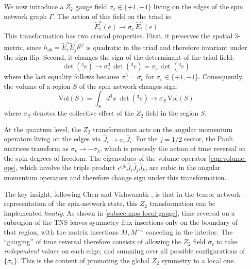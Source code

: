 \documentclass[preprint]{SciPost}
\theoremstyle{plain} %
\begin{document}
We now introduce a $ Z_2 $ gauge field $ \sigma_e \in \{+1, -1\} $ living on the edges of the spin network graph $ \Gamma $. The action of this field on the triad is:
\begin{equation}\label{eqn:z2-triad-action}
	\tilde E^a_i(e) \rightarrow \sigma_e \, \tilde E^a_i(e)
\end{equation}
This transformation has two crucial properties. First, it preserves the spatial 3-metric, since $ h_{ab} = \tilde E^a_i \tilde E^b_j \delta^{ij} $ is quadratic in the triad and therefore invariant under the sign flip. Second, it changes the sign of the determinant of the triad field:
\begin{equation}\label{eqn:z2-det-flip}
	\det({}^3 e) \rightarrow \sigma_e^3 \, \det({}^3 e) = \sigma_e \, \det({}^3 e)
\end{equation}
where the last equality follows because $ \sigma_e^3 = \sigma_e $ for $ \sigma_e \in \{+1, -1\} $. Consequently, the volume of a region $ S $ of the spin network changes sign:
\begin{equation}\label{eqn:z2-volume-flip}
	\text{Vol}(S) = \int_S d^3 x \, \det({}^3 e) \rightarrow \sigma_S \, \text{Vol}(S)
\end{equation}
where $ \sigma_S $ denotes the collective effect of the $ Z_2 $ field in the region $ S $.

At the quantum level, the $ Z_2 $ transformation acts on the angular momentum operators living on the edges via $ \hat J_i \rightarrow \sigma_e \hat J_i $. For the $ j = 1/2 $ sector, the Pauli matrices transform as $ \sigma_k \rightarrow -\sigma_k $, which is precisely the action of time reversal on the spin degrees of freedom. The eigenvalues of the volume operator \eqref{eqn:volume-ops}, which involve the triple product $ \epsilon^{ijk} \hat J_i \hat J_j \hat J_k $, are cubic in the angular momentum operators and therefore change sign under this transformation.

The key insight, following Chen and Vishwanath \cite{Chen2015Gauging}, is that in the tensor network representation of the spin-network state, this $ Z_2 $ transformation can be implemented \emph{locally}. As shown in \autoref{subsec:mps-local-gauge}, time reversal on a subregion of the TNS leaves symmetry flux insertions only on the boundary of that region, with the matrix insertions $ M, M^{-1} $ canceling in the interior. The ``gauging'' of time reversal therefore consists of allowing the $ Z_2 $ field $ \sigma_e $ to take \emph{independent} values on each edge, and summing over all possible configurations of $ \{\sigma_e\} $. This is the content of promoting the global $ Z_2 $ symmetry to a local one.
\end{document}
